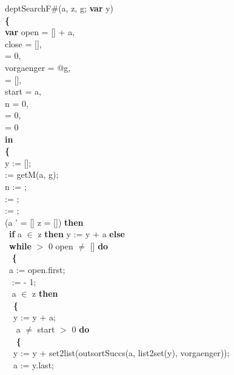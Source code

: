 {\parindent1cm 
deptSearchF\#(a, z, g; {\bf var} y) \\
{\bf \{}\\
{\bf var} open = [] + a,\\
 close = [],\\
  = 0,\\
 vorgaenger = @g,\\
  = [],\\
 start = a,\\
 n = 0,\\
  = 0,\\
  = 0\\
 {\bf in}\\
 {\bf \{}\\
\tabbe y := [];\\
\tabbe {} := getM(a, g);\\
\tabbe n := ;\\
\tabbe {} := ;\\
\tabbe {} := ;\\
 \Not (a ' = [] \Or z = []) {\bf then}\\
\tabbe \tabif\  {\bf if} a $\in$ z {\bf then} y := y + a {\bf else}\\
\tabbe \tabif\  {\bf while}  $>$ 0 \And open $\neq$ [] {\bf do}\\
\tabbe \tabif\  {\bf \{}\\
\tabbe \tabif\ \tabbe a := open.first;\\
\tabbe \tabif\ \tabbe {} :=  - 1;\\
\tabbe \tabif\  a $\in$ z {\bf then}\\
\tabbe \tabif\ \tabbe \tabif\  {\bf \{}\\
\tabbe \tabif\ \tabbe \tabif\ \tabbe y := y + a;\\
\tabbe \tabif\ \tabbe \tabif\  a $\neq$ start \And {} $>$ 0 {\bf do}\\
\tabbe \tabif\ \tabbe \tabif\ \tabbe {} {\bf \{}\\
\tabbe \tabif\ \tabbe \tabif\ \tabbe {}\tabbe y := y + set2list(outsortSuccs(a, list2set(y), vorgaenger));\\
\tabbe \tabif\ \tabbe \tabif\ \tabbe {}\tabbe a := y.last;\\
}
